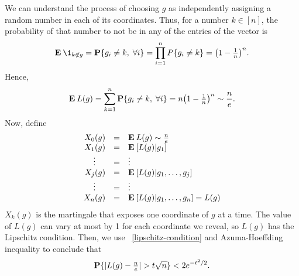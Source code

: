 We can understand the process of choosing $g$ as independently assigning a random number in each of its coordinates. Thus, for a number $k \in [n]$, the probability of that number to not be in any of the entries of the vector is
\[\E \1_{k \not\in g} = \P\{g_i \neq k, \; \forall i\} = \prod_{i = 1}^n P\{g_i \neq k\} = {\left(1-\tfrac{1}{n}\right)}^n. \] 
Hence,
\[ \E L(g) = \sum_{k = 1}^n \P\{g_i \neq k, \; \forall i\} = n {\left(1-\tfrac{1}{n}\right)}^n \sim \frac{n}{e}. \] 
Now, define
\[\begin{array}{rcl}
    X_0(g) & = & \E L(g) \sim \frac{n}{e}\\
    X_1(g) & = & \E [ L(g) | g_1 ] \\
    \hfill\vdots\hfill & = & \vdots \\
    X_j(g) & = & \E [L(g) | g_1, \ldots, g_j ]\\
    \hfill\vdots\hfill & = & \vdots \\
    X_n(g) & = & \E [L(g) | g_1, \ldots, g_n] = L(g)
\end{array} \] 
$X_k(g)$ is the martingale that exposes one coordinate of $g$ at a time. The value of $L(g)$ can vary at most by 1 for each coordinate we reveal, so $L(g)$ has the Lipschitz condition. Then, we use ~\ref{lipschitz-condition} and Azuma-Hoeffding inequality to conclude that
\[ \P\{|L(g) - \tfrac{n}{e}| > t\sqrt{n}\} < 2e^{-t^2 / 2}. \] 



\vspace*{3em}
